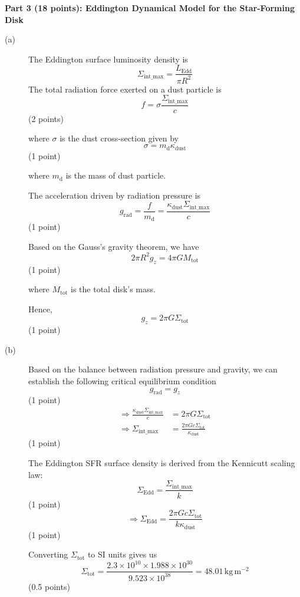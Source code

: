 \medskip\noindent\textbf{Part 3 (18 points): Eddington Dynamical Model for the Star-Forming Disk}
\begin{description}
\item[(a)] The Eddington surface luminosity density is
  \[ \Sigma_{\mathrm{int\_max}} = \frac{L_{\mathrm{Edd}}}{\pi R^2} \]
  The total radiation force exerted on a dust particle is
  \[ f = \sigma \frac{\Sigma_{\mathrm{int\_max}}}{c} \]
  \hfill(2 points)

  where $\sigma$ is the dust cross-section given by
  \[ \sigma = m_{\mathrm{d}} \kappa_{\mathrm{dust}} \]
  \hfill(1 point)

  where $m_{\mathrm{d}}$ is the mass of dust particle.

  The acceleration driven by radiation pressure is
  \[ g_{\mathrm{rad}} = \frac{f}{m_{\mathrm{d}}}
     = \frac{\kappa_{\mathrm{dust}} \Sigma_{\mathrm{int\_max}}}{c} \]
  \hfill(1 point)

  Based on the Gauss's gravity theorem, we have
  \[ 2\pi R^2 g_z = 4\pi G M_{\mathrm{tot}} \]
  \hfill(1 point)

  where $M_{\mathrm{tot}}$ is the total disk's mass.

  Hence,
  \[ g_z = 2\pi G \Sigma_{\mathrm{tot}} \]
  \hfill(1 point)

\item[(b)] Based on the balance between radiation pressure and gravity, we
  can establish the following critical equilibrium condition
  \[ g_{\mathrm{rad}} = g_z \]
  \hfill(1 point)
  \begin{align*}
    \Rightarrow \frac{\kappa_{\mathrm{dust}} \Sigma_{\mathrm{int\_max}}}{c}
      &= 2\pi G \Sigma_{\mathrm{tot}} \\
    \Rightarrow \Sigma_{\mathrm{int\_max}}
      &= \frac{2\pi G c \Sigma_{\mathrm{tot}}}{\kappa_{\mathrm{dust}}}
  \end{align*}
  \hfill(1 point)

  The Eddington SFR surface density is derived from the Kennicutt scaling
  law:
  \[ \Sigma_{\mathrm{Edd}} = \frac{\Sigma_{\mathrm{int\_max}}}{k} \]
  \hfill(1 point)
  \[ \Rightarrow \Sigma_{\mathrm{Edd}}
     = \frac{2\pi G c \Sigma_{\mathrm{tot}}}{k \kappa_{\mathrm{dust}}} \]
  \hfill(1 point)

  Converting $\Sigma_{\mathrm{tot}}$ to SI units gives us
  \[ \Sigma_{\mathrm{tot}}
     = \frac{2.3 \times 10^{10} \times 1.988 \times 10^{30}}{9.523 \times 10^{38}}
     = 48.01\,\mathrm{kg\,m^{-2}} \]
  \hfill(0.5 points)


\end{description}
